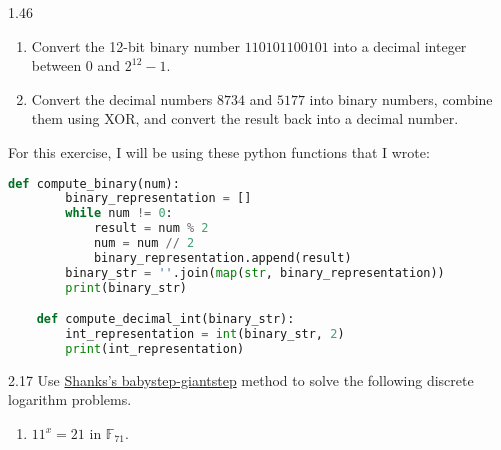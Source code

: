 \begin{exercise}
    {1.46}
    \begin{enumerate}
        \item Convert the 12-bit binary number \(110101100101\) into a decimal integer between \(0\) and \(2^{12} - 1\).
              \setcounter{enumi}{4}

        \item Convert the decimal numbers \(8734\) and \(5177\) into binary numbers, combine them using XOR, and convert the result back into a decimal number.
    \end{enumerate}
\end{exercise}

For this exercise, I will be using these python functions that I wrote: 
\begin{lstlisting}[language=python]
    def compute_binary(num):
        binary_representation = []
        while num != 0:
            result = num % 2
            num = num // 2
            binary_representation.append(result)
        binary_str = ''.join(map(str, binary_representation))
        print(binary_str)

    def compute_decimal_int(binary_str):
        int_representation = int(binary_str, 2)
        print(int_representation)
\end{lstlisting}


\begin{exercise}
    {2.17} Use \hyperlink{2.21}{Shanks's babystep-giantstep} method to solve the following discrete logarithm problems. 
    \begin{enumerate}
        \item \(11^x = 21\) in \(\mathbb{F}_{71}\).
    \end{enumerate}
\end{exercise}

